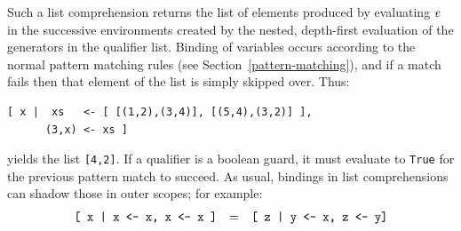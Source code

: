 Such a list comprehension returns the list of elements
produced by evaluating \mbox{$\it e$} in the successive environments
created by the nested, depth-first evaluation of the generators in the
qualifier list.  Binding of variables occurs according to the normal
pattern matching rules (see Section~\ref{pattern-matching}), and if a
match fails then that element of the list is simply skipped over.  Thus:\nopagebreak[4]
\bprog
{\small\begin{verbatim}
[ x |  xs   <- [ [(1,2),(3,4)], [(5,4),(3,2)] ], 
      (3,x) <- xs ]
\end{verbatim}}
\eprog
yields the list \mbox{\tt [4,2]}.  If a qualifier is a boolean guard, it must evaluate
to \mbox{\tt True} for the previous pattern match to succeed.  
As usual, bindings in list comprehensions can shadow those in outer
scopes; for example:
\[\ba{lll}
\mbox{\tt [\ x\ |\ x\ <-\ x,\ x\ <-\ x\ ]} & = & \mbox{\tt [\ z\ |\ y\ <-\ x,\ z\ <-\ y]} \\
\ea\]

